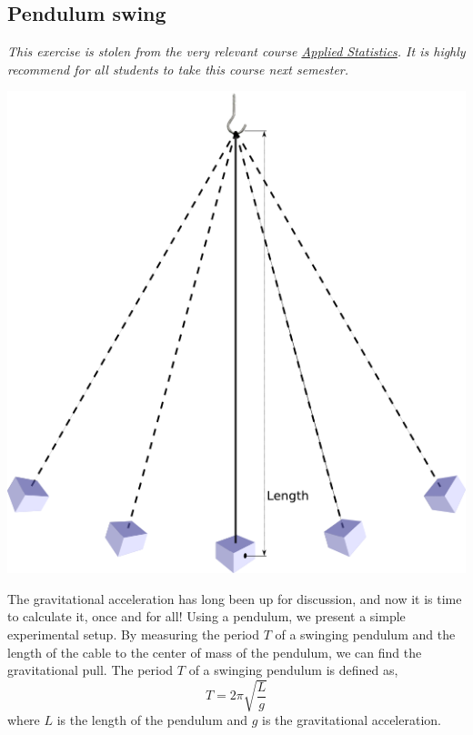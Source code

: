 \documentclass{article}
\begin{document}
\fi
\newpage


\subsection{Pendulum swing}

{
    \em
    This exercise is stolen from the very relevant course \href{http://kurser.ku.dk/course/nfyk13011u/2016-2017}{Applied Statistics}.
    It is highly recommend for all students to take this course next semester.
}\\

\begin{center}
\includegraphics[scale=0.4]{images/week5_pendulum.png}
\end{center}

The gravitational acceleration has long been up for discussion, and now it is time to calculate it, once and for all!
%
Using a pendulum, we present a simple experimental setup.
By measuring the period $T$ of a swinging pendulum and the length of the cable to the center of mass of the pendulum, we can find the gravitational pull.
The period $T$ of a swinging pendulum is defined as,
%
\begin{equation}
T = 2\pi\sqrt{\frac{L}{g}} \label{eq:pendul_t}
\end{equation}
%
where $L$ is the length of the pendulum and $g$ is the gravitational acceleration.\\
\end{document}
